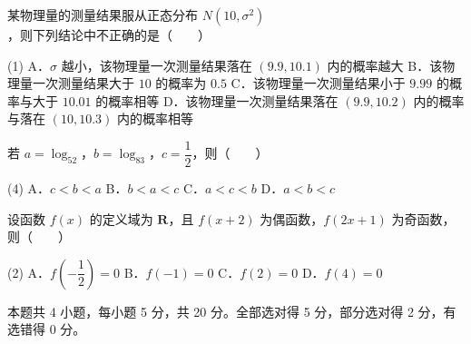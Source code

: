 \begin{question}
某物理量的测量结果服从正态分布 $N\left(10,\sigma^{2}\right)$，则下列结论中不正确的是\mbox{（　　）}

\begin{gkopts}(1)
\task A．$\sigma$ 越小，该物理量一次测量结果落在 $(9.9,10.1)$ 内的概率越大
\task B．该物理量一次测量结果大于 $10$ 的概率为 $0.5$
\task C．该物理量一次测量结果小于 $9.99$ 的概率与大于 $10.01$ 的概率相等
\task D．该物理量一次测量结果落在 $(9.9,10.2)$ 内的概率与落在 $(10,10.3)$ 内的概率相等
\end{gkopts}

\end{question}
\begin{question}
若 $a=\log_52$，$b=\log_83$，$c=\dfrac12$，则\mbox{（　　）}

\begin{gkopts}(4)
\task A．$c<b<a$
\task B．$b<a<c$
\task C．$a<c<b$
\task D．$a<b<c$
\end{gkopts}

\end{question}
\begin{question}
设函数 $f(x)$ 的定义域为 $\mathbf R$，且 $f(x+2)$ 为偶函数，$f(2x+1)$ 为奇函数，则\mbox{（　　）}

\begin{gkopts}(2)
\task A．$f\left(-\dfrac12\right)=0$
\task B．$f(-1)=0$
\task C．$f(2)=0$
\task D．$f(4)=0$
\end{gkopts}

\par\medskip

\end{question}

\begin{gktip}
本题共 4 小题，每小题 5 分，共 20 分。全部选对得 5 分，部分选对得 2 分，有选错得 0 分。
\end{gktip}

